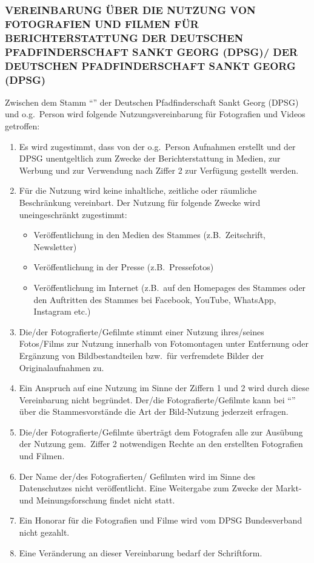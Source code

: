 
\subsubsection*{VEREINBARUNG ÜBER DIE NUTZUNG VON FOTOGRAFIEN UND FILMEN FÜR BERICHTERSTATTUNG DER 
	DEUTSCHEN PFADFINDERSCHAFT SANKT GEORG (DPSG)/\MakeUppercase{\orgName} DER DEUTSCHEN
	PFADFINDERSCHAFT SANKT GEORG (DPSG)}
Zwischen dem Stamm \enquote{\orgName} der Deutschen Pfadfinderschaft Sankt Georg (DPSG) und o.g.\ Person wird folgende Nutzungsvereinbarung für Fotografien und
Videos getroffen:

\begin{enumerate}
	\item Es wird zugestimmt, dass von der o.g.\ Person Aufnahmen erstellt und der DPSG unentgeltlich zum
	Zwecke der Berichterstattung in Medien, zur Werbung und zur Verwendung nach Ziffer 2 zur 
	Verfügung gestellt werden.
	\item Für die Nutzung wird keine inhaltliche, zeitliche oder räumliche Beschränkung vereinbart.
	Der Nutzung für folgende Zwecke wird uneingeschränkt zugestimmt:
	\begin{itemize}[noitemsep]
		\item Veröffentlichung in den Medien des Stammes (z.B.\ Zeitschrift, Newsletter)
		\item Veröffentlichung in der Presse (z.B.\ Pressefotos)
		\item Veröffentlichung im Internet (z.B.\ auf den Homepages des Stammes oder den Auftritten des
		Stammes bei Facebook, YouTube, WhatsApp, Instagram etc.)
	\end{itemize}
	\item Die/der Fotografierte/Gefilmte stimmt einer Nutzung ihres/seines Fotos/Films zur Nutzung innerhalb 
	von Fotomontagen unter Entfernung oder Ergänzung von Bildbestandteilen bzw.\ für verfremdete
	Bilder der Originalaufnahmen zu.
	\item Ein Anspruch auf eine Nutzung im Sinne der Ziffern 1 und 2 wird durch diese Vereinbarung nicht 
	begründet.
	Der/die Fotografierte/Gefilmte kann bei \enquote{\orgName} über die
	Stammesvorstände die Art der Bild-Nutzung jederzeit erfragen.
	\item Die/der Fotografierte/Gefilmte überträgt dem Fotografen alle zur Ausübung der Nutzung gem.\ Ziffer 2
	notwendigen Rechte an den erstellten Fotografien und Filmen.
	\item Der Name der/des Fotografierten/ Gefilmten wird im Sinne des Datenschutzes nicht veröffentlicht. 
	Eine Weitergabe zum Zwecke der Markt- und Meinungsforschung findet nicht statt.
	\item Ein Honorar für die Fotografien und Filme wird vom DPSG Bundesverband nicht gezahlt.
	\item Eine Veränderung an dieser Vereinbarung bedarf der Schriftform.
\end{enumerate}
